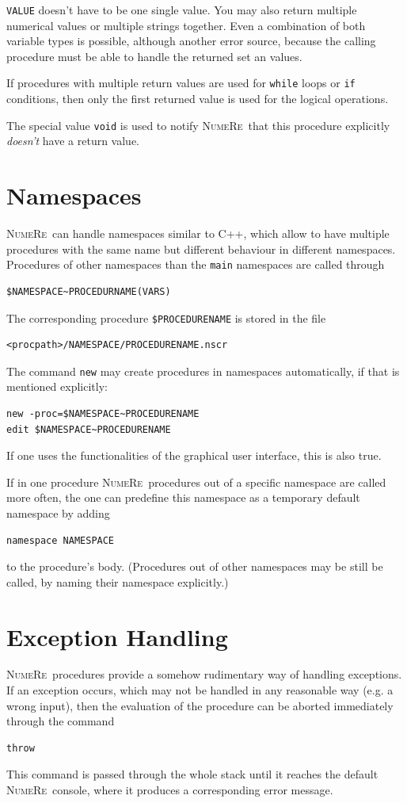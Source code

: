\documentclass[DIV=14,headsepline,footsepline]{scrbook}
\newcommand{\NR}{\textsc{Nu\-me\-Re}}
\begin{document}
				\lstinline+VALUE+ doesn't have to be one single value. You may also return multiple numerical values or multiple strings together. Even a combination of both variable types is possible, although another error source, because the calling procedure must be able to handle the returned set an values.
				
				If procedures with multiple return values are used for \lstinline+while+ loops or \lstinline+if+ conditions, then only the first returned value is used for the logical operations.
				
				The special value \lstinline+void+ is used to notify \NR\ that this procedure explicitly \emph{doesn't} have a return value.
			\section{Namespaces}
				\NR\ can handle namespaces similar to C++, which allow to have multiple procedures with the same name but different behaviour in different namespaces. Procedures of other namespaces than the \lstinline+main+ namespaces are called through 
				\begin{lstlisting}
$NAMESPACE~PROCEDURNAME(VARS)
				\end{lstlisting}
				The corresponding procedure \lstinline+$PROCEDURENAME+ is stored in the file 
				\begin{lstlisting}
<procpath>/NAMESPACE/PROCEDURENAME.nscr
				\end{lstlisting}
				The command \lstinline+new+ may create procedures in namespaces automatically, if that is mentioned explicitly:
				\begin{lstlisting}
new -proc=$NAMESPACE~PROCEDURENAME
edit $NAMESPACE~PROCEDURENAME
				\end{lstlisting}
				If one uses the functionalities of the graphical user interface, this is also true.
				
				If in one procedure \NR\ procedures out of a specific namespace are called more often, the one can predefine this namespace as a temporary default namespace by adding
				\begin{lstlisting}
namespace NAMESPACE
				\end{lstlisting}
				to the procedure's body. (Procedures out of other namespaces may be still be called, by naming their namespace explicitly.)
			\section{Exception Handling}
				\NR\ procedures provide a somehow rudimentary way of handling exceptions. If an exception occurs, which may not be handled in any reasonable way (e.g. a wrong input), then the evaluation of the procedure can be aborted immediately through the command
				\begin{lstlisting}
throw
				\end{lstlisting}
				This command is passed through the whole stack until it reaches the default \NR\ console, where it produces a corresponding error message.
				
\end{document}
